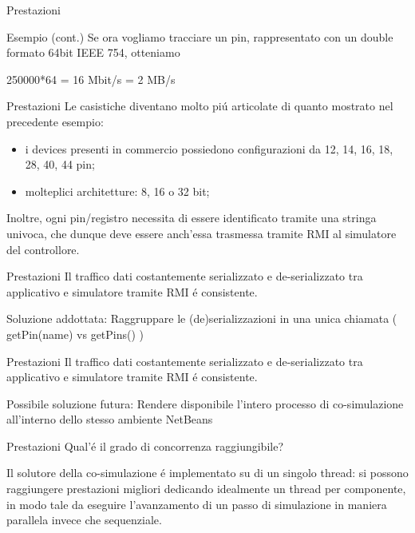 \documentclass{beamer}
\begin{document}
\begin{frame}{Prestazioni}
\begin{exampleblock}{Esempio (cont.)}
  Se ora vogliamo tracciare un pin, rappresentato con un double formato 64bit IEEE 754, otteniamo
    \begin{center}
      250000*64 = 16 Mbit/s = 2 MB/s
    \end{center}
\end{exampleblock}
\end{frame}

\begin{frame}{Prestazioni}
Le casistiche diventano molto pi\'u articolate di quanto mostrato nel precedente esempio:
\begin{itemize}
  \item i devices presenti in commercio possiedono configurazioni da 12, 14, 16, 18, 28, 40, 44 pin;
  \item molteplici architetture: 8, 16 o 32 bit;
\end{itemize}

Inoltre, ogni pin/registro necessita di essere identificato tramite una stringa univoca, che dunque
deve essere anch'essa trasmessa tramite RMI al simulatore del controllore.
\end{frame}

\begin{frame}{Prestazioni}
Il traffico dati costantemente serializzato e de-serializzato tra applicativo e simulatore tramite RMI \'e consistente.
\begin{block}{Soluzione addottata:}
  Raggruppare le (de)serializzazioni in una unica chiamata ( getPin(name) vs getPins() )
\end{block}
\end{frame}

\begin{frame}{Prestazioni}
Il traffico dati costantemente serializzato e de-serializzato tra applicativo e simulatore tramite RMI \'e consistente.
\begin{block}{Possibile soluzione futura:}
  Rendere disponibile l'intero processo di co-simulazione all'interno dello stesso ambiente NetBeans
\end{block}
\end{frame}

\begin{frame}{Prestazioni}
Qual’\'e il grado di concorrenza raggiungibile?

\bigskip

Il solutore della co-simulazione \'e implementato su di un singolo thread: si possono raggiungere prestazioni migliori dedicando
idealmente un thread per componente, in modo tale da eseguire l'avanzamento di un passo di simulazione in maniera parallela invece che sequenziale.
\end{frame}
\end{document}

